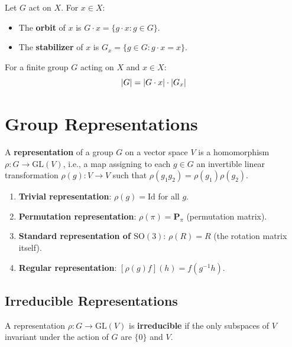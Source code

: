 \begin{definition}
Let $G$ act on $X$. For $x \in X$:
\begin{itemize}
    \item The \textbf{orbit} of $x$ is $G \cdot x = \{g \cdot x : g \in G\}$.
    \item The \textbf{stabilizer} of $x$ is $G_x = \{g \in G : g \cdot x = x\}$.
\end{itemize}
\end{definition}

\begin{theorem}
For a finite group $G$ acting on $X$ and $x \in X$:
\[
    \left| G \right| = \left| G \cdot x \right| \cdot \left| G_x \right|
\]
\end{theorem}

\section{Group Representations}

\begin{definition}[Representation]
A \textbf{representation} of a group $G$ on a vector space $V$ is a
homomorphism $\rho: G \to \mathrm{GL}(V)$, i.e., a map assigning to each
$g \in G$ an invertible linear transformation $\rho(g): V \to V$ such that
$\rho(g_1 g_2) = \rho(g_1)\rho(g_2)$.
\end{definition}

\begin{example}
\begin{enumerate}
    \item \textbf{Trivial representation}: $\rho(g) = \mathrm{Id}$ for all $g$.
    \item \textbf{Permutation representation}: $\rho(\pi) = \mathbf{P}_\pi$
          (permutation matrix).
    \item \textbf{Standard representation of $\mathrm{SO}(3)$}: $\rho(R) = R$
          (the rotation matrix itself).
    \item \textbf{Regular representation}: $[\rho(g)f](h) = f(g^{-1}h)$.
\end{enumerate}
\end{example}

\subsection{Irreducible Representations}

\begin{definition}
A representation $\rho: G \to \mathrm{GL}(V)$ is \textbf{irreducible} if the
only subspaces of $V$ invariant under the action of $G$ are $\{0\}$ and $V$.
\end{definition}

